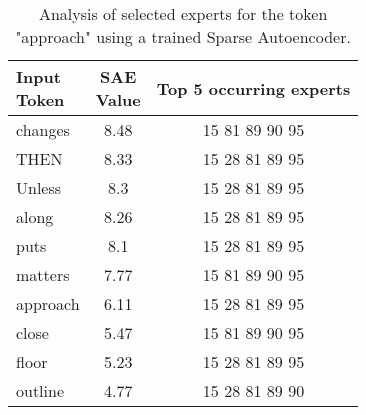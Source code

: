 \begin{table}[]
    \centering
    \begin{tabular}{lcc}
        \makecell{Input \\ Token} & \makecell{SAE \\ Value}  & Top 5 occurring experts \\
        \toprule
        changes & 8.48 & 15 \hfill 81 \hfill 89 \hfill 90 \hfill 95\\
        THEN & 8.33 & 15 \hfill 28 \hfill 81 \hfill 89 \hfill 95\\
        Unless & 8.3 & 15 \hfill 28 \hfill 81 \hfill 89 \hfill 95\\
        along & 8.26 & 15 \hfill 28 \hfill 81 \hfill 89 \hfill 95\\
        puts & 8.1 & 15 \hfill 28 \hfill 81 \hfill 89 \hfill 95\\
        matters & 7.77 & 15 \hfill 81 \hfill 89 \hfill 90 \hfill 95\\
        approach & 6.11 & 15 \hfill 28 \hfill 81 \hfill 89 \hfill 95\\
        close & 5.47 & 15 \hfill 81 \hfill 89 \hfill 90 \hfill 95\\
        floor & 5.23 & 15 \hfill 28 \hfill 81 \hfill 89 \hfill 95\\
        outline & 4.77 & 15 \hfill 28 \hfill 81 \hfill 89 \hfill 90\\
        \bottomrule
    \end{tabular}
    \caption{Analysis of selected experts for the token "approach" using a trained Sparse Autoencoder.}
    \label{tab:sae_approach}
\end{table}


